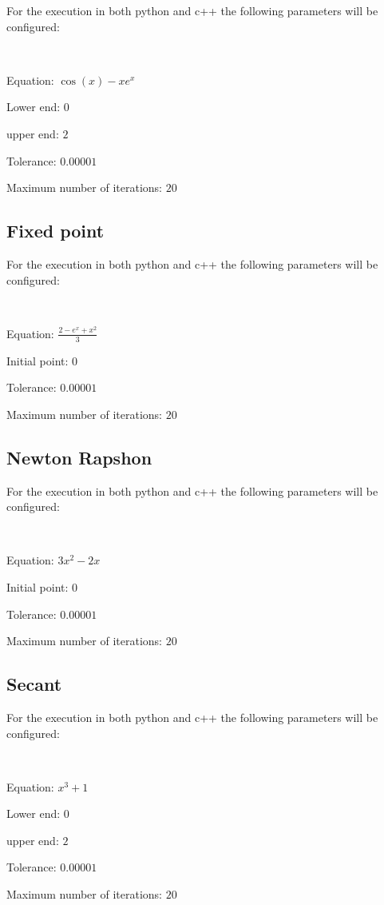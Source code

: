 \documentclass[conference]{IEEEtran}
\begin{document}
For the execution in both python and c++ the following parameters will be configured:

\

Equation: \( \cos(x) - x e^x \) 

Lower end: \(0\)

upper end: \(2\)

Tolerance: \(0.00001\) 

Maximum number of iterations: \(20\)


\subsection{Fixed point}

For the execution in both python and c++ the following parameters will be configured:

\

Equation: \(\frac{2 - e^x + x^2}{3}\)

Initial point: \(0\)

Tolerance: \(0.00001\) 

Maximum number of iterations: \(20\)


\subsection{Newton Rapshon}

For the execution in both python and c++ the following parameters will be configured:

\

Equation: \( 3x^2  - 2x  \) 

Initial point: \(0\)

Tolerance: \(0.00001\) 

Maximum number of iterations: \(20\)



\subsection{Secant}

For the execution in both python and c++ the following parameters will be configured:

\ 

Equation: \(x^3 + 1\) 

Lower end: \(0\)

upper end: \(2\)

Tolerance: \(0.00001\) 

Maximum number of iterations: \(20\)
\end{document}
